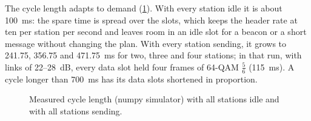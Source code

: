 \documentclass[11pt,a4paper,oneside]{report}
\begin{document}
The cycle length adapts to demand (\cref{fig:cyclelen}). With every station idle it is about
\SI{100}{ms}: the spare time is spread over the slots, which keeps the header rate at ten per station
per second and leaves room in an idle slot for a beacon or a short message without changing the plan.
With every station sending, it grows to 241.75, 356.75 and \SI{471.75}{ms} for two, three and four
stations; in that run, with links of 22--\SI{28}{dB}, every data slot held four frames of 64-QAM
$\tfrac56$ (\SI{115}{ms}). A cycle longer than \SI{700}{ms} has its data slots shortened in proportion.

\begin{figure}[htbp]
\centering
{}
\caption{Measured cycle length (numpy simulator) with all stations idle and with all stations sending.}
\label{fig:cyclelen}
\end{figure}
\end{document}
